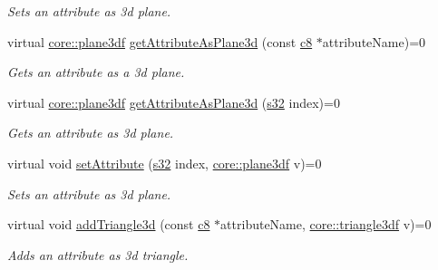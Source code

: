 \begin{DoxyCompactItemize}
\begin{DoxyCompactList}\small\item\em Sets an attribute as 3d plane. \end{DoxyCompactList}\item 
virtual \hyperlink{namespaceirr_1_1core_a97c9b39d4c6f71dbd9ded0153c4fa7f7}{core\+::plane3df} \hyperlink{classirr_1_1io_1_1IAttributes_a1d660e66f832cd670a47f5898bc0f5df}{get\+Attribute\+As\+Plane3d} (const \hyperlink{namespaceirr_a9395eaea339bcb546b319e9c96bf7410}{c8} $\ast$attribute\+Name)=0
\begin{DoxyCompactList}\small\item\em Gets an attribute as a 3d plane. \end{DoxyCompactList}\item 
virtual \hyperlink{namespaceirr_1_1core_a97c9b39d4c6f71dbd9ded0153c4fa7f7}{core\+::plane3df} \hyperlink{classirr_1_1io_1_1IAttributes_adcb6bc5b7d76f8299b587b34b7dfaeee}{get\+Attribute\+As\+Plane3d} (\hyperlink{namespaceirr_ac66849b7a6ed16e30ebede579f9b47c6}{s32} index)=0
\begin{DoxyCompactList}\small\item\em Gets an attribute as 3d plane. \end{DoxyCompactList}\item 
\mbox{\label{classirr_1_1io_1_1IAttributes_a51277b8aa2971cb070ab9ebfadf586a1}} 
virtual void \hyperlink{classirr_1_1io_1_1IAttributes_a51277b8aa2971cb070ab9ebfadf586a1}{set\+Attribute} (\hyperlink{namespaceirr_ac66849b7a6ed16e30ebede579f9b47c6}{s32} index, \hyperlink{namespaceirr_1_1core_a97c9b39d4c6f71dbd9ded0153c4fa7f7}{core\+::plane3df} v)=0
\begin{DoxyCompactList}\small\item\em Sets an attribute as 3d plane. \end{DoxyCompactList}\item 
\mbox{\label{classirr_1_1io_1_1IAttributes_a0f27f971247a14b10945bade9534b045}} 
virtual void \hyperlink{classirr_1_1io_1_1IAttributes_a0f27f971247a14b10945bade9534b045}{add\+Triangle3d} (const \hyperlink{namespaceirr_a9395eaea339bcb546b319e9c96bf7410}{c8} $\ast$attribute\+Name, \hyperlink{namespaceirr_1_1core_a8983bda2678a7a67d97bf3c7be6c31c7}{core\+::triangle3df} v)=0
\begin{DoxyCompactList}\small\item\em Adds an attribute as 3d triangle. \end{DoxyCompactList}\item 

\end{DoxyCompactItemize}
